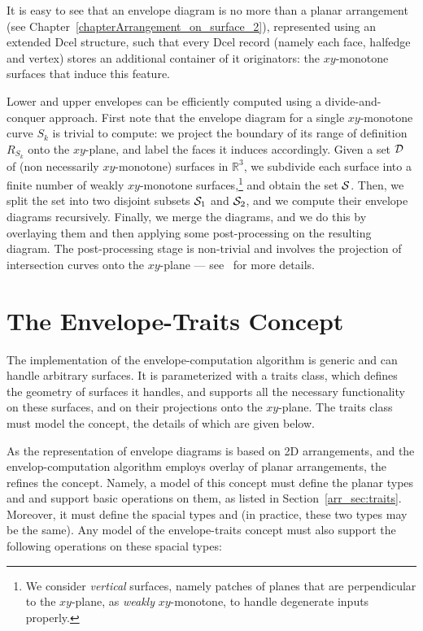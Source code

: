 It is easy to see that an envelope diagram is no more than a planar
arrangement (see Chapter~\ref{chapterArrangement_on_surface_2}), represented
using an extended {\sc Dcel} structure, such that every {\sc Dcel}
record (namely each face, halfedge and vertex) stores an additional
container of it originators: the $xy$-monotone surfaces that induce
this feature.

Lower and upper envelopes can be efficiently computed using a
divide-and-conquer approach. First note that the envelope diagram for
a single $xy$-monotone curve $S_k$ is trivial to compute: we project
the boundary of its range of definition $R_{S_k}$ onto the $xy$-plane,
and label the faces it induces accordingly. Given a set ${\cal D}$
of (non necessarily $xy$-monotone) surfaces in ${\mathbb R}^3$, we subdivide
each surface into a finite number of weakly $xy$-monotone 
surfaces,\footnote{We consider {\em vertical} surfaces, namely patches 
of planes that are perpendicular to the $xy$-plane, as {\em weakly} 
$xy$-monotone, to handle degenerate inputs properly.} and obtain the 
set ${\cal S}$. Then, we split the set into two disjoint subsets ${\cal S}_1$
and ${\cal S}_2$, and we compute their envelope diagrams recursively.
Finally, we merge the diagrams, and we do this by overlaying them and 
then applying some post-processing on the resulting diagram. The 
post-processing stage is non-trivial and involves the projection of 
intersection curves onto the $xy$-plane --- see~\cite{cgal:m-rgece-06}
for more details.

\section{The Envelope-Traits Concept}

The implementation of the envelope-computation algorithm is generic and
can handle arbitrary surfaces. It is parameterized with a traits class,
which defines the geometry of surfaces it handles, and supports all
the necessary functionality on these surfaces, and on their projections 
onto the $xy$-plane. The traits class must model the 
 concept, the details of which are given below.

As the representation of envelope diagrams is based on 2D
arrangements, and the envelop-computation algorithm employs overlay
of planar arrangements, the  refines the
 concept. Namely, a model of this 
concept must define the planar types  and 
 and support basic operations on them, as 
listed in Section~\ref{arr_sec:traits}. Moreover, it must define the 
spacial types  and  (in practice,
these two types may be the same). Any model of the envelope-traits
concept must also support the following operations on these spacial
types:

